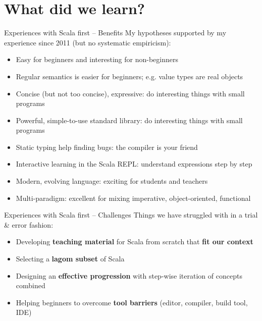 \documentclass[aspectratio=169]{beamer}
\newcommand{\Section}[1]{\titleimagecolor{red}\section{#1}}
\newenvironment{Slide}[1]%
  {\begin{frame}[environment=Slide]{#1}}
  {\end{frame}}%
\begin{document}


\Section{What did we learn?}


\begin{Slide}{Experiences with Scala first -- Benefits}
  My hypotheses supported by my experience since 2011 (but no systematic empiricism):
  \begin{itemize}
  \item Easy for beginners and interesting for non-beginners %
  \item Regular semantics is easier for beginners; e.g. value types are real objects
  \item Concise (but not too concise), expressive: do interesting things with small programs
  \item Powerful, simple-to-use standard library: do interesting things with small programs
  \item Static typing help finding bugs: the compiler is your friend
  \item Interactive learning in the Scala REPL: understand expressions step by step
  \item Modern, evolving language: exciting for students and teachers
  \item Multi-paradigm: excellent for mixing imperative, object-oriented, functional
  \end{itemize}  
\end{Slide}

\begin{Slide}{Experiences with Scala first -- Challenges}
  Things we have struggled with in a trial \& error fashion:
  \begin{itemize}
  \item Developing \textbf{teaching material} for Scala from scratch that \textbf{fit our context} 
  \item Selecting a \textbf{lagom subset} of Scala
  \item Designing an \textbf{effective progression} with step-wise iteration of concepts combined
  \item Helping beginners to overcome \textbf{tool barriers} (editor, compiler, build tool, IDE)
  \end{itemize}  
\end{Slide}
\end{document}
